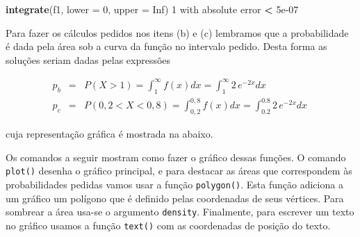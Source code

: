 \documentclass[10pt,a4paper]{book}
\newenvironment{Shaded}{\begin{snugshade}}{\end{snugshade}}
\newcommand{\KeywordTok}[1]{\textcolor[rgb]{0.13,0.29,0.53}{\textbf{#1}}}
\newcommand{\DataTypeTok}[1]{\textcolor[rgb]{0.13,0.29,0.53}{#1}}
\newcommand{\DecValTok}[1]{\textcolor[rgb]{0.00,0.00,0.81}{#1}}
\newcommand{\FloatTok}[1]{\textcolor[rgb]{0.00,0.00,0.81}{#1}}
\newcommand{\StringTok}[1]{\textcolor[rgb]{0.31,0.60,0.02}{#1}}
\newcommand{\OtherTok}[1]{\textcolor[rgb]{0.56,0.35,0.01}{#1}}
\newcommand{\OperatorTok}[1]{\textcolor[rgb]{0.81,0.36,0.00}{\textbf{#1}}}
\newcommand{\NormalTok}[1]{#1}
\begin{document}
\begin{Shaded}
\begin{Highlighting}[]
\KeywordTok{integrate}\NormalTok{(f1, }\DataTypeTok{lower =} \DecValTok{0}\NormalTok{, }\DataTypeTok{upper =} \OtherTok{Inf}\NormalTok{)}
\DecValTok{1}\NormalTok{ with absolute error }\OperatorTok{<}\StringTok{ }\FloatTok{5e-07}
\end{Highlighting}
\end{Shaded}

Para fazer os cálculos pedidos nos itens (b) e (c) lembramos que a
probabilidade é dada pela área sob a curva da função no intervalo
pedido. Desta forma as soluções seriam dadas pelas expressões

\begin{eqnarray*}
 p_b & = & P(X > 1) = \int_1^\infty f(x) dx = \int_1^\infty 2\,e^{-2x} dx \\
 p_c & = & P(0,2 < X < 0,8) = \int_{0,2}^{0,8} f(x) dx = \int_{0.2}^{0.8} 2\,e^{-2x} dx \,
\end{eqnarray*}

cuja representação gráfica é mostrada na abaixo.

Os comandos a seguir mostram como fazer o gráfico dessas funções. O
comando \texttt{plot()} desenha o gráfico principal, e para destacar as
áreas que correspondem às probabilidades pedidas vamos usar a função
\texttt{polygon()}. Esta função adiciona a um gráfico um polígono que é
definido pelas coordenadas de seus vértices. Para sombrear a área usa-se
o argumento \texttt{density}. Finalmente, para escrever um texto no
gráfico usamos a função \texttt{text()} com as coordenadas de posição do
texto.
\end{document}
